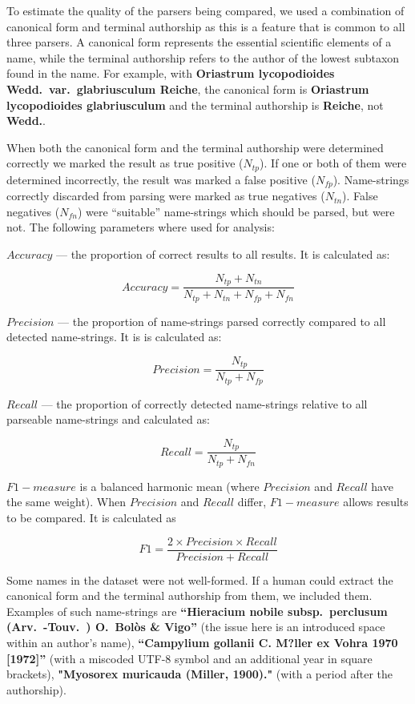 \documentclass{bmcart}
\begin{document}
To estimate the quality of the parsers being compared, we used a combination of
canonical form and terminal authorship as this is a feature that is common to
all three parsers. A canonical form represents the essential scientific
elements of a name, while the terminal authorship refers to the author of the
lowest subtaxon found in the name. For example, with \textbf{Oriastrum
  lycopodioides Wedd.\ var.\ glabriusculum Reiche}, the canonical form is
\textbf{Oriastrum lycopodioides glabriusculum} and the terminal authorship is
\textbf{Reiche}, not \textbf{Wedd.}.

When both the canonical form and the terminal authorship were determined
correctly we marked the result as true positive ($N_{tp}$). If one or both of
them were determined incorrectly, the result was marked a false positive
($N_{fp}$). Name-strings correctly discarded from parsing were marked as true
negatives ($N_{tn}$). False negatives ($N_{fn}$) were ``suitable''
name-strings which should be parsed, but were not. The following parameters
where used for analysis:

$Accuracy$ --- the proportion of correct results to all results. It is
calculated as:

\[Accuracy = \dfrac{N_{tp} + N_{tn}}{N_{tp} + N_{tn} + N_{fp} + N_{fn}}\]

$Precision$ --- the proportion of name-strings parsed correctly compared to
all detected name-strings. It is is calculated as:

\[Precision = \dfrac{N_{tp}}{N_{tp} + N_{fp}}\]

$Recall$ --- the proportion of correctly detected name-strings relative to
all parseable name-strings and calculated as:

\[Recall = \dfrac{N_{tp}}{N_{tp} + N_{fn}}\]

$F1-measure$ is a balanced harmonic mean (where $Precision$ and $Recall$ have
the same weight). When $Precision$ and $Recall$ differ, $F1-measure$ allows
results to be compared. It is calculated as

\[F1 = \dfrac{2 \times Precision \times Recall}{Precision + Recall}\]


Some names in the dataset were not well-formed. If a human could extract the
canonical form and the terminal authorship from them, we included them.
Examples of such name-strings are \textbf{``Hieracium nobile subsp.\ perclusum
(Arv.\ -Touv.\ ) O.\ Bolòs \& Vigo''} (the issue here is an introduced space
within an author's name), \textbf{``Campylium gollanii C. M?ller ex Vohra 1970
[1972]''} (with a miscoded UTF-8 symbol and an additional year in square
brackets), \textbf{"Myosorex muricauda (Miller, 1900)."} (with a period after
the authorship).
\end{document}
